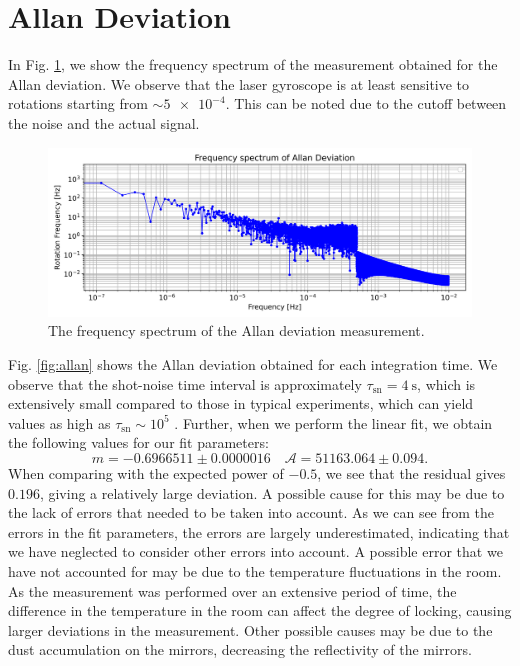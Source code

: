 \documentclass[a4paper]{report}
\numberwithin{equation}{section}
\begin{document}
\section{Allan Deviation}

In Fig. \ref{fig:allan_fs}, we show the frequency spectrum of the measurement obtained for the Allan deviation. We observe that the laser gyroscope is 
at least sensitive to rotations starting from $\sim \num{5e-4}$. This can be noted due to the cutoff between the noise and the 
actual signal. 

\begin{figure}[h!]
	\centering
	\includegraphics[width=0.8\columnwidth]{allan_fs.png}
	\caption{The frequency spectrum of the Allan deviation measurement.}
	\label{fig:allan_fs}
\end{figure}

Fig. \ref{fig:allan} shows the Allan deviation obtained for each integration time. We observe that the shot-noise time interval is approximately $\tau_{\mathrm{sn}} = \SI{4}{\second}$, which is extensively small 
compared to those in typical experiments, which can yield values as high as $\tau_{\mathrm{sn}} \sim 10^{5}$ \cite{Groh2021}. 
Further, when we perform the linear fit, we obtain the following values for our fit parameters: 
\begin{equation}
	m = -0.6966511 \pm 0.0000016 \quad \mathcal{A} = 51163.064 \pm 0.094. 
\end{equation}
When comparing with the expected power of $-0.5$, we see that the residual gives $0.196$, giving a relatively large deviation. 
A possible cause for this may be due to the lack of errors that needed to be taken into account. As we can see from the errors in 
the fit parameters, the errors are largely underestimated, indicating that we have neglected to consider other errors into account.
A possible error that we have not accounted for may be due to the temperature fluctuations in the room. As the measurement was performed
over an extensive period of time, the difference in the temperature in the room can affect the degree of locking, causing larger 
deviations in the measurement. Other possible causes may be due to the dust accumulation on the mirrors, decreasing the reflectivity of the 
mirrors. \par 
\end{document}

